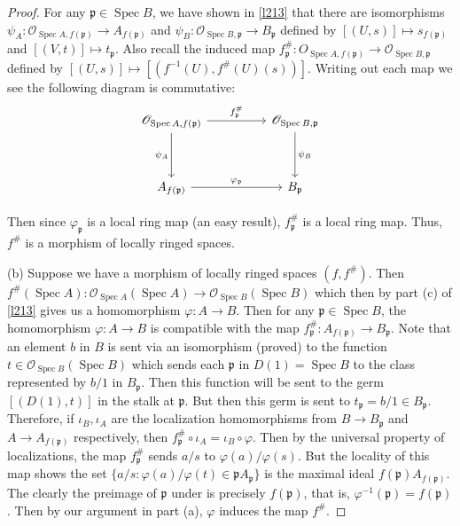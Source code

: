 \documentclass[12pt,letter]{article}
\newcommand{\Spec}[0]{\operatorname{Spec}}
\begin{document}
\begin{proof}
	For any $\mathfrak p\in\Spec B$, we have shown in \autoref{l213} that there are isomorphisms $\psi_A:\mathscr O_{\Spec A, f(\mathfrak p)}\to A_{f(\mathfrak p)}$ and $\psi_B:\mathscr O_{\Spec B, \mathfrak p}\to B_{\mathfrak p}$ defined by $[(U, s)]\mapsto s_{f(\mathfrak p)}$ and $[(V, t)]\mapsto t_{\mathfrak p}$. Also recall the induced map $f^\#_{\mathfrak p}:O_{\Spec A, f(\mathfrak p)}\to \mathscr O_{\Spec B, \mathfrak p}$ defined by $[(U, s)]\mapsto [(f^{-1}(U), f^\#(U)(s))]$. Writing out each map we see the following diagram is commutative:
	\[
	\begin{tikzcd}
{\mathscr O_{\operatorname{Spec} A, f(\mathfrak p)}} \arrow[rr, "f^\#_{\mathfrak p}"] \arrow[dd, "\psi_A"'] &  & {\mathscr O_{\operatorname{Spec} B, \mathfrak p}} \arrow[dd, "\psi_B"] \\
                                                                                                            &  &                                                                        \\
A_{f(\mathfrak p)} \arrow[rr, "\varphi_{\mathfrak p}"]                                                      &  & B_{\mathfrak p}                                                       
\end{tikzcd}
	\]
	
	Then since $\varphi_{\mathfrak p}$ is a local ring map (an easy result), $f^\#_{\mathfrak p}$ is a local ring map. Thus, $f^\#$ is a morphism of locally ringed spaces.
	
	(b) Suppose we have a morphism of locally ringed spaces $(f, f^\#)$. Then $f^\#(\Spec A):\mathscr O_{\Spec A}(\Spec A)\to \mathscr O_{\Spec B}(\Spec B)$ which then by part (c) of \autoref{l213} gives us a homomorphism $\varphi: A\to B$. Then for any $\mathfrak p\in \Spec B$, the homomorphism $\varphi: A\to B$ is compatible with the map $f^\#_{\mathfrak p}:A_{f(\mathfrak p)}\to B_{\mathfrak p}$. Note that an element $b$ in $B$ is sent via an isomorphism (proved) to the function $t\in \mathscr O_{\Spec B}(\Spec B)$ which sends each $\mathfrak p$ in $D(1)=\Spec B$ to the class represented by $b/1$ in $B_{\mathfrak p}$. Then this function will be sent to the germ $[(D(1), t)]$ in the stalk at $\mathfrak p$. But then this germ is sent to $t_{\mathfrak p}=b/1\in B_{\mathfrak p}$. Therefore, if $\iota_B, \iota_A$ are the localization homomorphisms from $B\to B_{\mathfrak p}$ and $A\to A_{f(\mathfrak p)}$ respectively, then $f^\#_{\mathfrak p}\circ \iota_A=\iota_B\circ \varphi$. Then by the universal property of localizations, the map $f^\#_{\mathfrak p}$ sends $a/s$ to $\varphi(a)/\varphi(s)$. But the locality of this map shows the set $\{a/s:\varphi(a)/\varphi(t)\in \mathfrak pA_{\mathfrak p}\}$ is the maximal ideal $f(\mathfrak p)A_{f(\mathfrak p)}$. The clearly the preimage of $\mathfrak p$ under is precisely $f(\mathfrak p)$, that is, $\varphi^{-1}(\mathfrak p)=f(\mathfrak p)$. Then by our argument in part (a), $\varphi$ induces the map $f^\#$.
	\end{proof}
\end{document}
